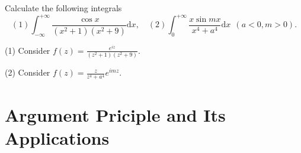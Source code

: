 \begin{example}{}{}
  Calculate the following integrals
  \begin{equation}
    (1) \int_{-\infty}^{+\infty} \frac{\cos x}{(x^2 + 1)(x^2 + 9)}\mathrm{d} x, \quad
    (2) \int_0^{+\infty} \frac{x \sin mx}{x^4 + a^4}\mathrm{d} x ~~ (a < 0, m > 0).
  \end{equation}
\end{example}

\begin{solution}
  (1) Consider $f(z) = \frac{e^{iz}}{(z^2 + 1)(z^2 + 9)}$.

  (2) Consider $f(z) = \frac{z}{z^4 + a^4}e^{imz}$.
\end{solution}

\section{Argument Priciple and Its Applications}


